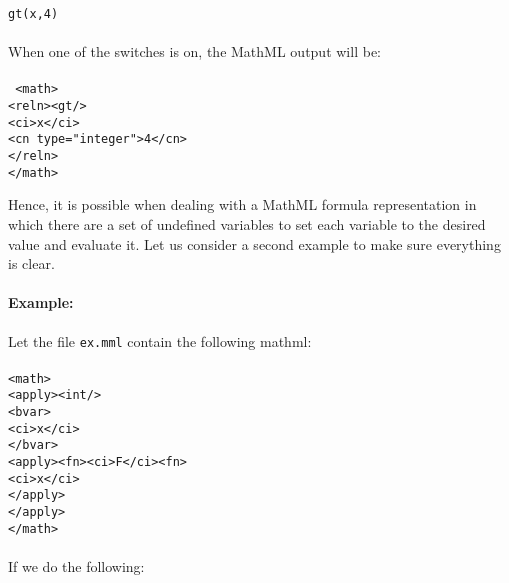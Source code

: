 \documentclass{article}
\begin{document}
{\tt gt(x,4)}
\\
\\
When one of the switches is on, the MathML output will be:
\\
\\
{\tt 
\hspace*{1mm}<math>\\
\hspace*{5mm}   <reln><gt/>\\
\hspace*{9mm}      <ci>x</ci>\\
\hspace*{9mm}      <cn type="integer">4</cn>\\
\hspace*{5mm}   </reln>\\
\hspace*{1mm}</math>\\}

Hence, it is possible when dealing with a MathML formula representation in
which there are a set of undefined variables to set each variable to the
desired value and evaluate it. Let us consider a second example to make sure
everything is clear.

\paragraph{Example:}

Let the file {\tt ex.mml} contain the following mathml:
\\
\\
{\tt               <math>\\
\hspace*{2mm}       <apply><int/>\\
\hspace*{5mm}        <bvar>\\
\hspace*{9mm}         <ci>x</ci>\\
\hspace*{5mm}        </bvar>\\
\hspace*{5mm}        <apply><fn><ci>F</ci><fn>\\
\hspace*{9mm}         <ci>x</ci>\\
\hspace*{5mm}        </apply>\\
\hspace*{2mm}       </apply>\\
                  </math>}  \\
\\
If we do the following:\\
\end{document}
